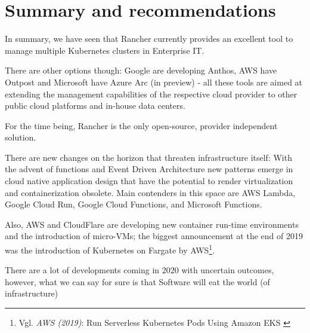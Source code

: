 %
%

\pagebreak
\section{Summary and recommendations}

\onehalfspacing

In summary, we have seen that Rancher currently provides an excellent tool to manage multiple Kubernetes clusters in Enterprise IT.

There are other options though: Google are developing Anthos, AWS have Outpost and Microsoft have Azure Arc (in preview) - all these tools are aimed at extending the management capabilities of the respective cloud provider to other public cloud platforms and in-house data centers.

For the time being, Rancher is the only open-source, provider independent solution.

There are new changes on the horizon that threaten infrastructure itself: With the advent of functions and Event Driven Architecture new patterns emerge in cloud native application design that have the potential to render virtualization and containerization obsolete. Main contenders in this space are AWS Lambda, Google Cloud Run, Google Cloud Functions, and Microsoft Functions.

Also, AWS and CloudFlare are developing new container run-time environments and the introduction of micro-VMs; the biggest announcement at the end of 2019 was the introduction of Kubernetes on Fargate by AWS\footnote{Vgl. \textit{AWS (2019)}: Run Serverless Kubernetes Pods Using Amazon EKS \cite{eksFargate}}.

There are a lot of developments coming in 2020 with uncertain outcomes, however, what we can say for sure is that Software will eat the world (of infrastructure)
